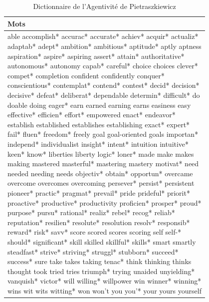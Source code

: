 \begin{table}[H]
\caption{Dictionnaire de l’Agentivité de Pietraszkiewicz}
\centering
\bigskip
\begin{tabular}{|p{0.8\linewidth}|}
    \hline
    Mots \\
    \hline
    able accomplish* accurac* accurate* achiev* acquir* actualiz* adaptab* adept* ambition* ambitious* aptitude* aptly aptness aspiration* aspire* aspiring assert* attain* authoritative* autonomous* autonomy capab* careful* choice choices clever* compet* completion confident confidently conquer* conscientious* contemplat* contend* contest* decid* decision* decisive* defeat* deliberat* dependable determin* difficult* do doable doing eager* earn earned earning earns easiness easy effective* efficien* effort* empowered enact* endeavor* establish established establishes establishing exact* expert* fail* fluen* freedom* freely goal goal-oriented goals importan* independ* individualist insight* intent* intuition intuitive* keen* know* liberties liberty logic* loner* made make makes making mastered masterful* mastering mastery motivat* need needed needing needs objectiv* obtain* opportun* overcame overcome overcomes overcoming persever* persist* persistent pioneer* practic* pragmat* prevail* pride prideful* priorit* proactive* productive* productivity proficien* prosper* proud* purpose* pursu* rational* realiz* rebel* recog* reliab* reputation* resilien* resolute* resolution resolv* responsib* reward* risk* savv* score scored scores scoring self self-* should* significant* skill skilled skillful* skills* smart smartly steadfast* strive* striving* struggl* stubborn* succeed* success* sure take takes taking tenac* think thinking thinks thought took tried tries triumph* trying unaided unyielding* vanquish* victor* will willing* willpower win winner* winning* wins wit wits witting* won won't you you'* your yours yourself \\
    \hline
\end{tabular}
 \label{Tab:dico_pietra}
\end{table}

